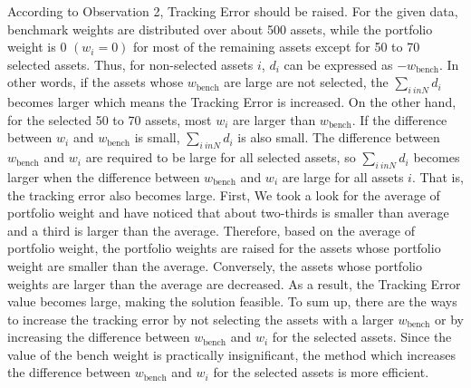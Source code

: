 \documentclass[11pt]{article}
\begin{document}
\begin{itemize}
	
	According to Observation 2, Tracking Error should be raised. For the given data, benchmark weights are distributed over about 500 assets, while the portfolio weight is 0 $(w_i = 0)$ for most of the remaining assets except for 50 to 70 selected assets. Thus, for non-selected assets $i$, $d_i$ can be expressed as $-w_{\text{bench}}$. In other words, if the assets whose $w_{\text{bench}}$ are large are not selected, the $\sum_{i \ inN}d_i$ becomes larger which means the Tracking Error is increased. %
	On the other hand, for the selected 50 to 70 assets, most $w_i $ are larger than $w_{\text{bench}}$. If the difference between $w_i$ and $w_{\text{bench}}$ is small, $ \sum_{i \ inN}d_i$  is also small. The difference between $w_{\text{bench}}$ and $w_i$ are required to be large for all selected assets,  so $ \sum_{i \ inN}d_i$ becomes larger when the difference between $w_{\text{bench}}$ and $w_i$ are large for all assets $i$. That is, the tracking error also becomes large. First, We took a look for the average of portfolio weight and have noticed that about two-thirds is smaller than average and a third is larger than the average. Therefore, based on the average of portfolio weight, the portfolio weights are raised for the assets whose portfolio weight are smaller than the average. Conversely, the assets whose portfolio weights are larger than the average are decreased. As a result, the Tracking Error value becomes large, making the solution feasible. To sum up, there are the ways to increase the tracking error by not selecting the assets with a larger $w_{\text{bench}}$ or by increasing the difference between $w_{\text{bench}}$ and $w_i$ for the selected assets. Since the value of the bench weight is practically insignificant, the method which increases the difference between $w_{\text{bench}}$ and $w_i$ for the selected assets is more efficient. 
	

\end{itemize}
\end{document}
